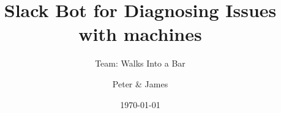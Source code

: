 \documentclass[aspectratio=169]{beamer}
\title{Slack Bot for Diagnosing Issues with machines}
\subtitle{Team: Walks Into a Bar}
\author{Peter \& James}
\institute[]{DMS Hackathon 2020}
\date{\today}
\begin{document}
\maketitleslide
\end{document}
